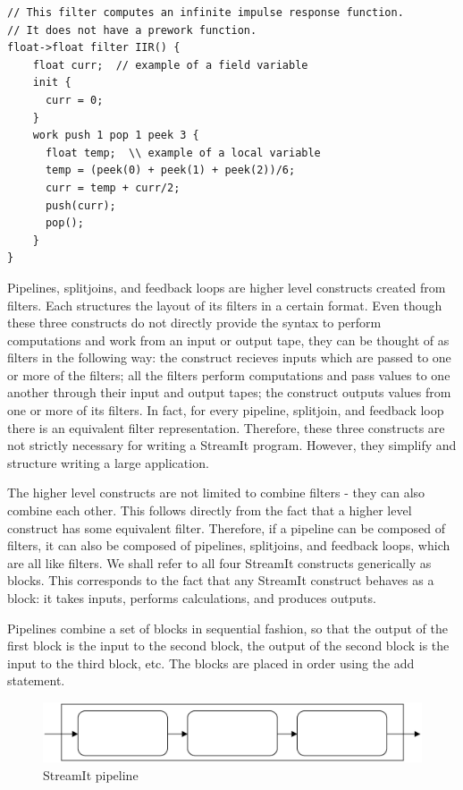 \begin{scriptsize}
\begin{verbatim}
// This filter computes an infinite impulse response function.
// It does not have a prework function.
float->float filter IIR() {
    float curr;  // example of a field variable
    init {
      curr = 0;
    }
    work push 1 pop 1 peek 3 {
      float temp;  \\ example of a local variable
      temp = (peek(0) + peek(1) + peek(2))/6;
      curr = temp + curr/2;
      push(curr);
      pop();
    }
}
\end{verbatim}
\end{scriptsize}

    Pipelines, splitjoins, and feedback loops are higher level
constructs created from filters. Each structures the layout of its
filters in a certain format. Even though these three constructs do
not directly provide the syntax to perform computations and work
from an input or output tape, they can be thought of as filters in
the following way: the construct recieves inputs which are passed
to one or more of the filters; all the filters perform
computations and pass values to one another through their input
and output tapes; the construct outputs values from one or more of
its filters. In fact, for every pipeline, splitjoin, and feedback
loop there is an equivalent filter representation. Therefore,
these three constructs are not strictly necessary for writing a
StreamIt program. However, they simplify and structure writing a
large application.

    The higher level constructs are not limited to combine filters -
they can also combine each other. This follows directly from the
fact that a higher level construct has some equivalent filter.
Therefore, if a pipeline can be composed of filters, it can also
be composed of pipelines, splitjoins, and feedback loops, which
are all like filters. We shall refer to all four StreamIt
constructs generically as blocks. This corresponds to the fact
that any StreamIt construct behaves as a block: it takes inputs,
performs calculations, and produces outputs.

    Pipelines combine a set of blocks in sequential fashion, so that
the output of the first block is the input to the second block,
the output of the second block is the input to the third block,
etc. The blocks are placed in order using the add statement.

\begin{figure}[bthp]
  \centering
  \includegraphics[width=6.0in]{figures/pipeline.eps}
  \caption{StreamIt pipeline}
  \label{fig:pipeline}
\end{figure}

